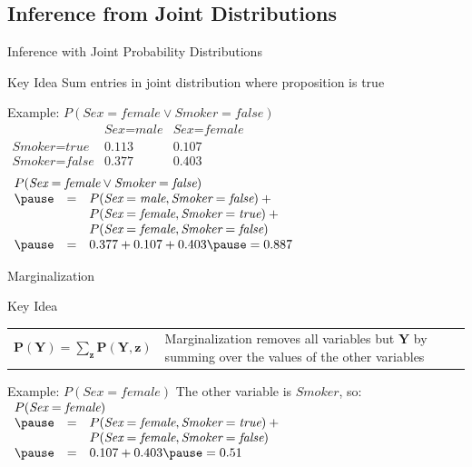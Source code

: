 \documentclass[14pt]{beamer}
\begin{document}
\subsection{Inference from Joint Distributions}
\begin{frame}{Inference with Joint Probability Distributions}
	\begin{block}{Key Idea}
		Sum entries in joint distribution where proposition is true
	\end{block}
	\pause
	\begin{block}{Example: $P(\textit{Sex}=\textit{female} \lor \textit{Smoker}=\textit{false})$}
		\tab\tab
		$
		\begin{array}{lcc}
			                           & \textit{Sex}=\textit{male} & \textit{Sex}=\textit{female} \\
			\textit{Smoker}=\textit{true}  & 0.113                  & 0.107 \\
			\textit{Smoker}=\textit{false} & 0.377                  & 0.403 \\
		\end{array}
		$
		\\ \medskip
		\pause
		$
		\begin{array}{lll}
			\lefteqn{P(\textit{Sex}=\textit{female} \lor \textit{Smoker}=\textit{false})} \\
			\pause
			& = & P(\textit{Sex}=\textit{male},\textit{Smoker}=\textit{false}) + \mbox{}\\
			&   & P(\textit{Sex}=\textit{female},\textit{Smoker}=\textit{true}) + \mbox{}\\
			&   & P(\textit{Sex}=\textit{female},\textit{Smoker}=\textit{false})\\
			\pause
			& = & 0.377 + 0.107 + 0.403 \pause = 0.887
		\end{array}
		$
	\end{block}
\end{frame}
\begin{frame}{Marginalization}
	\begin{block}{Key Idea}
		\begin{tabular}{lm{2.5in}}
			$
			\mathbf{P}(\mathbf{Y})
				= \sum\limits_{\mathbf{z}}{\mathbf{P}(\mathbf{Y}, \mathbf{z})}
			$
			&
			\alert{Marginalization} removes all variables but $\mathbf{Y}$ by summing over the values of the other variables
		\end{tabular}
	\end{block}
	\pause
	\begin{block}{Example: $P(\textit{Sex}=\textit{female})$}
		The other variable is $\textit{Smoker}$, so: \\[.5em]
		$
		\begin{array}{lll}
			\lefteqn{P(\textit{Sex}=\textit{female})} \\
			\pause & = & P(\textit{Sex}=\textit{female},\textit{Smoker}=\textit{true}) + \mbox{}\\
			       &   & P(\textit{Sex}=\textit{female},\textit{Smoker}=\textit{false})\\
			\pause & = & 0.107 + 0.403 \pause = 0.51
		\end{array}
		$
	\end{block}
\end{frame}
\end{document}
